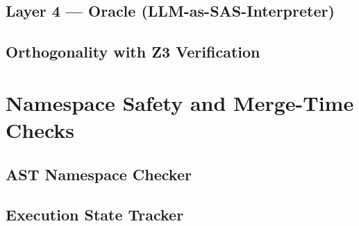 \documentclass[12pt,a4paper]{report}
\begin{document}
  \subsection{Layer 4 --- Oracle (LLM-as-SAS-Interpreter)}
  \label{subsec:sc-l4}

  \subsection{Orthogonality with Z3 Verification}
  \label{subsec:sc-orthogonality}

\section{Namespace Safety and Merge-Time Checks}
\label{sec:namespace-impl}

  \subsection{AST Namespace Checker}
  \label{subsec:namespace-checker-impl}

  \subsection{Execution State Tracker}
  \label{subsec:execution-state-impl}
\end{document}
